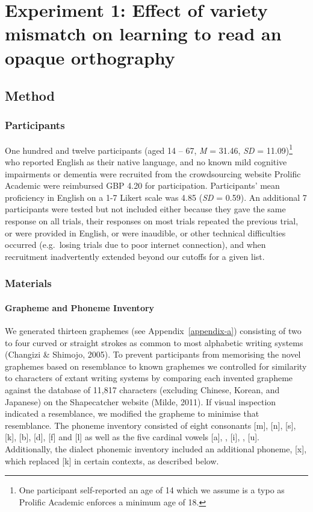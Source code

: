 \documentclass[doc,floatsintext]{apa6}
\let\oldparagraph\paragraph
\renewcommand{\paragraph}[1]{\oldparagraph{#1}\mbox{}}
\let\rmarkdownfootnote\footnote%
\def\footnote{\protect\rmarkdownfootnote}
\begin{document}
\section{Experiment 1: Effect of variety mismatch on learning to read an
opaque
orthography}\label{experiment-1-effect-of-variety-mismatch-on-learning-to-read-an-opaque-orthography}

\subsection{Method}\label{method}

\subsubsection{Participants}\label{participants}

One hundred and twelve participants (aged 14 -- 67, \emph{M} = 31.46,
\emph{SD} = 11.09)\footnote{One participant self-reported an age of 14
  which we assume is a typo as Prolific Academic enforces a minimum age
  of 18.} who reported English as their native language, and no known
mild cognitive impairments or dementia were recruited from the
crowdsourcing website Prolific Academic were reimbursed GBP 4.20 for
participation. Participants' mean proficiency in English on a 1-7 Likert
scale was 4.85 (\emph{SD} = 0.59). An additional 7 participants were
tested but not included either because they gave the same response on
all trials, their responses on most trials repeated the previous trial,
or were provided in English, or were inaudible, or other technical
difficulties occurred (e.g.~losing trials due to poor internet
connection), and when recruitment inadvertently extended beyond our
cutoffs for a given list.

\subsubsection{Materials}\label{materials}

\paragraph{Grapheme and Phoneme
Inventory}\label{grapheme-and-phoneme-inventory}

We generated thirteen graphemes (see Appendix~\ref{appendix-a})
consisting of two to four curved or straight strokes as common to most
alphabetic writing systems (Changizi \& Shimojo, 2005). To prevent
participants from memorising the novel graphemes based on resemblance to
known graphemes we controlled for similarity to characters of extant
writing systems by comparing each invented grapheme against the database
of 11,817 characters (excluding Chinese, Korean, and Japanese) on the
Shapecatcher website (Milde, 2011). If visual inspection indicated a
resemblance, we modified the grapheme to minimise that resemblance. The
phoneme inventory consisted of eight consonants {[}m{]}, {[}n{]},
{[}s{]}, {[}k{]}, {[}b{]}, {[}d{]}, {[}f{]} and {[}l{]} as well as the
five cardinal vowels {[}a{]}, \textipa{[E]}, {[}i{]}, \textipa{[O]},
{[}u{]}. Additionally, the dialect phonemic inventory included an
additional phoneme, {[}x{]}, which replaced {[}k{]} in certain contexts,
as described below.
\end{document}
